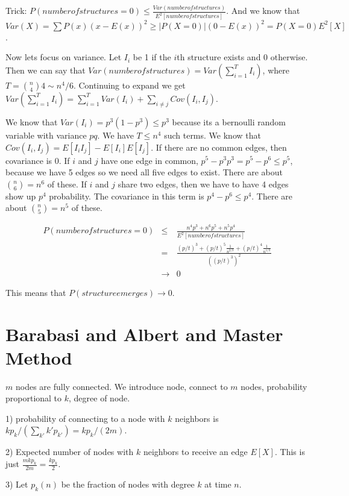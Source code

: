 \documentclass[psamsfonts]{amsart}
\begin{document}
Trick: $P(number of structures = 0) \leq \frac{Var(number of structures)}{E^2[number of structures]}$. And we know that $Var(X) = \sum P(x)(x - E(x))^2 \geq |P(X = 0)|(0 - E(x))^2 = P(X = 0) E^2[X]$.

Now lets focus on variance. Let $I_i$ be 1 if the $i$th structure exists and 0 otherwise. Then we can say that $Var(number of structures) = Var(\sum_{i =1}^T I_i)$, where $T = {n \choose 4} 4 \sim n^4/6$. Continuing to expand we get $Var(\sum_{i=1}^T I_i) = \sum_{i=1}^T Var(I_i) + \sum_{i \neq j} Cov(I_i, I_j)$.

We know that $Var(I_i) = p^3 ( 1 - p^3) \leq p^3 $ because its a bernoulli random variable with variance $pq$. We have $T \leq n^4$ such terms. We know that $Cov(I_i, I_j) = E[I_i I_j] - E[I_i] E[I_j]$. If there are no common edges, then covariance is 0. If $i$ and $j$ have one edge in common, $p^5 - p^3 p^3 = p^5 - p^6 \leq p^5$, because we have 5 edges so we need all five edges to exist. There are about ${n \choose 6} = n^6$ of these. If $i$ and $j$ share two edges, then we have to have 4 edges show up $p^4$ probability. The covariance in this term is $p^4 - p^6 \leq p^4$. There are about ${n \choose 5} = n^5$ of these.

\begin{eqnarray}
  P(number of structures = 0) &\leq& \frac{n^4 p^3 + n^6 p^5 + n^5 p^4}{E^2[number of structures]} \\
                              &=& \frac{(p/t)^3 + (p/t)^5 \frac{1}{n^{2/3}} + (p/t)^4 \frac{1}{n^{1/3}}}{((p/t)^3)^2} \\
                              &\to& 0
\end{eqnarray}

This means that $P(structure emerges) \to 0$.

\section{Barabasi and Albert and Master Method}

$m$ nodes are fully connected. We introduce node, connect to $m$ nodes, probability proportional to $k$, degree of node.

1) probability of connecting to a node with $k$ neighbors is $k p_k / (\sum_{k'} k' p_{k'}) = k p_k / (2m)$.

2) Expected number of nodes with $k$ neighbors to receive an edge $E[X]$. This is just $\frac{m k p_k}{2m} = \frac{k p_k}{2}$.

3) Let $p_k(n)$ be the fraction of nodes with degree $k$ at time $n$.
\end{document}

